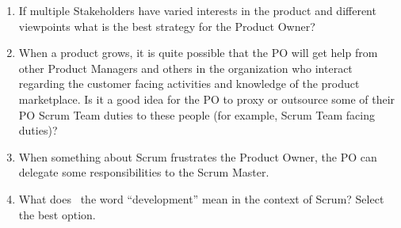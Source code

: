 \begin{enumerate}
	\item If multiple Stakeholders have varied interests in the product and different viewpoints what is the best strategy for the Product Owner?

	\item When a product grows, it is quite possible that the PO will get help from other Product Managers and others in the organization who interact regarding the customer facing activities and knowledge of the product marketplace. Is it a good idea for the PO to proxy or outsource some of their PO Scrum Team duties to these people (for example, Scrum Team facing duties)?

	\item When something about Scrum frustrates the Product Owner, the PO can delegate some responsibilities to the Scrum Master.

	\item What does  the word “development” mean in the context of Scrum? Select the best option.


\end{enumerate}
